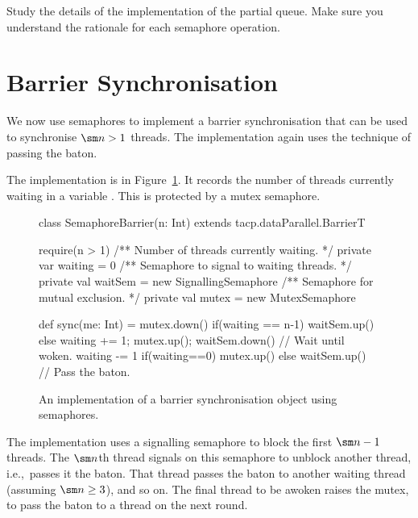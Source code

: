 \begin{instruction}
Study the details of the implementation of the partial queue.  Make sure you
understand the rationale for each semaphore operation.
\end{instruction}


\section{Barrier Synchronisation}

We now use semaphores to implement a barrier synchronisation that can be used
to synchronise $\sm n > 1$ threads.  The implementation again uses the
technique of passing the baton.  

The implementation is in Figure~\ref{fig:SemaphoreBarrier}.  It records the
number of threads currently waiting in a variable .  This is
protected by a mutex semaphore.


\begin{figure}%
\begin{scala}
class SemaphoreBarrier(n: Int) extends tacp.dataParallel.BarrierT{
  require(n > 1)
  /** Number of threads currently waiting. */
  private var waiting = 0 
  /** Semaphore to signal to waiting threads. */
  private val waitSem = new SignallingSemaphore
  /** Semaphore for mutual exclusion. */
  private val mutex = new MutexSemaphore

  def sync(me: Int) = {
    mutex.down()
    if(waiting == n-1) waitSem.up()
    else{ 
      waiting += 1; mutex.up(); waitSem.down() // Wait until woken.
      waiting -= 1
      if(waiting==0) mutex.up() else waitSem.up() // Pass the baton.
    }
  }
}
\end{scala}
\caption{An implementation of a barrier synchronisation object using
  sem\-a\-phores.}
\label{fig:SemaphoreBarrier}
\end{figure}

The implementation uses a signalling semaphore  to block the
first $\sm n-1$ threads.  The $\sm n$th thread signals on this semaphore to
unblock another thread, i.e.,~passes it the baton.  That thread passes the
baton to another waiting thread (assuming $\sm n \ge 3$), and so on.  The
final thread to be awoken raises the mutex, to pass the baton to a thread on
the next round.


